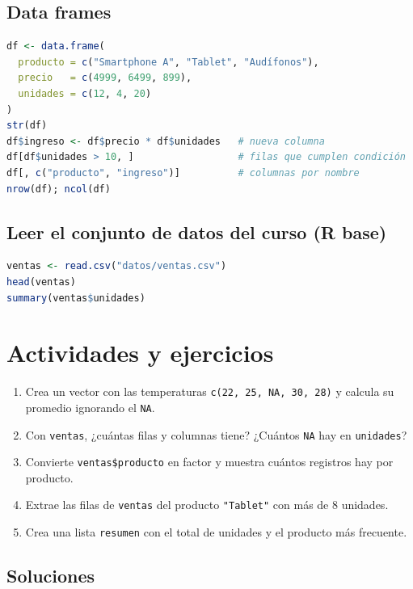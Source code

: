 \subsection{Data frames}

\begin{lstlisting}[language=R]
df <- data.frame(
  producto = c("Smartphone A", "Tablet", "Audífonos"),
  precio   = c(4999, 6499, 899),
  unidades = c(12, 4, 20)
)
str(df)
df$ingreso <- df$precio * df$unidades   # nueva columna
df[df$unidades > 10, ]                  # filas que cumplen condición
df[, c("producto", "ingreso")]          # columnas por nombre
nrow(df); ncol(df)
\end{lstlisting}

\subsection{Leer el conjunto de datos del curso (R base)}

\begin{lstlisting}[language=R]
ventas <- read.csv("datos/ventas.csv")
head(ventas)
summary(ventas$unidades)
\end{lstlisting}

\section{Actividades y ejercicios}

\begin{enumerate}
\def\labelenumi{\arabic{enumi}.}
\tightlist
\item
  Crea un vector con las temperaturas
  \passthrough{\lstinline!c(22, 25, NA, 30, 28)!} y calcula su promedio
  ignorando el \passthrough{\lstinline!NA!}.
\item
  Con \passthrough{\lstinline!ventas!}, ¿cuántas filas y columnas tiene?
  ¿Cuántos \passthrough{\lstinline!NA!} hay en
  \passthrough{\lstinline!unidades!}?
\item
  Convierte \passthrough{\lstinline!ventas$producto!} en factor y
  muestra cuántos registros hay por producto.
\item
  Extrae las filas de \passthrough{\lstinline!ventas!} del producto
  \passthrough{\lstinline!"Tablet"!} con más de 8 unidades.
\item
  Crea una lista \passthrough{\lstinline!resumen!} con el total de
  unidades y el producto más frecuente.
\end{enumerate}

\subsection{Soluciones}

